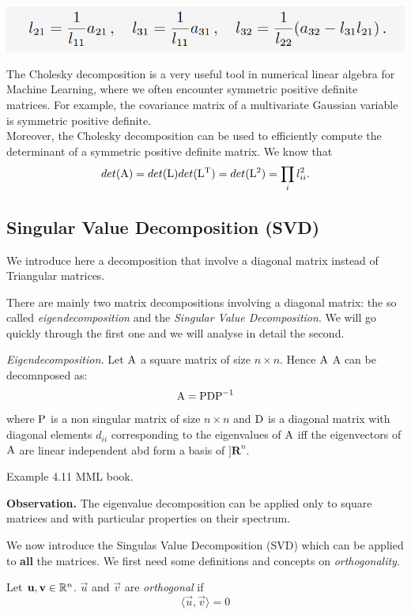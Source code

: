 \includegraphics[width=0.8 \textwidth]{sections/images/chol3.png}

The Cholesky decomposition is a very useful tool in numerical linear algebra for Machine Learning, where we often encounter symmetric positive definite matrices. For example, the covariance matrix of a multivariate Gaussian variable
is symmetric positive definite. \\
Moreover, the Cholesky decomposition can be used to efficiently compute the determinant of a symmetric positive definite matrix. We know that $$det(\mathrm{A})=det(\mathrm{L}) det(\mathrm{L^T})=det(\mathrm{L}^2)=\prod_i l_{ii}^2.$$

\subsection{Singular Value Decomposition (SVD)}

We introduce here a decomposition that involve a diagonal matrix instead of Triangular matrices.

There are mainly two matrix decompositions involving a diagonal matrix: the so called \textit{eigendecomposition} and the \textit{Singular Value Decomposition}.
We will go quickly through the first one and we will analyse in detail the second.

\begin{proposition}
\textit{Eigendecomposition.} Let $\mathrm{A}$ a square matrix of size $n \times n$. Hence $\mathrm{A}$ A can be decomnposed as:
$$\mathrm{A}=\mathrm{PDP}^{-1}$$
where $\mathrm{P}$ is a non singular matrix of size $n \times n$ and $\mathrm{D}$ is a diagonal matrix with diagonal elements $d_{ii}$ corresponding to the eigenvalues of $\mathrm{A}$ iff the eigenvectors of $\mathrm{A}$ are linear independent abd form a basis of $]\mathbf{R}^n$.
\end{proposition}

Example 4.11 MML book.

\textbf{Observation.}  The eigenvalue decomposition can be applied only to square matrices and with particular properties on their spectrum.

We now introduce the Singulas Value Decomposition (SVD) which can be applied to \textbf{all} the matrices.
We first need some definitions and concepts on \textit{orthogonality}. 

\begin{definition}
    Let $\mathbf{u}, \mathbf{v} \in \mathbb{R}^n$. $\vec{u}$ and $\vec{v}$ are \textit{orthogonal} if
    $$ \langle\vec{u}, \vec{v}\rangle = 0 $$
\end{definition}

